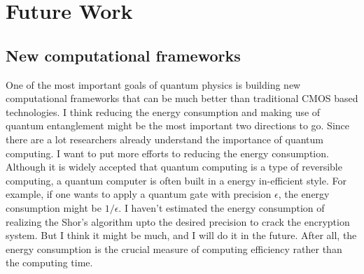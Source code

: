 \documentclass[a4paper]{article}
\newcommand{\<}{\langle}
\renewcommand{\>}{\rangle}
\begin{document}
\section{Future Work}


\subsection{New computational frameworks}
One of the most important goals of quantum physics is building new computational frameworks that can be much better than traditional CMOS based technologies.
I think reducing the energy consumption and making use of quantum entanglement might be the most important two directions to go.
Since there are a lot researchers already understand the importance of quantum computing.
I want to put more efforts to reducing the energy consumption. Although it is widely accepted that quantum computing is a type of reversible computing, a quantum computer is often built in a energy in-efficient style.
For example, if one wants to apply a quantum gate with precision $\epsilon$, the energy consumption might be $1/\epsilon$.
I haven't estimated the energy consumption of realizing the Shor's algorithm upto the desired precision to crack the encryption system.
But I think it might be much, and I will do it in the future.
After all, the energy consumption is the crucial measure of computing efficiency rather than the computing time.
\end{document}
